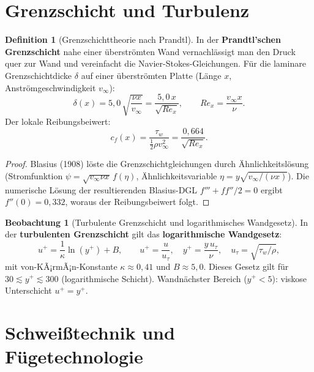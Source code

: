 ﻿\documentclass[a4paper,12pt]{report}
\theoremstyle{definition}
\newtheorem{definition}{Definition}
\newtheorem{beobachtung}{Beobachtung}
\begin{document}

\section{Grenzschicht und Turbulenz}

\begin{definition}[Grenzschichttheorie nach Prandtl]
In der \textbf{Prandtl'schen Grenzschicht} nahe einer überströmten
Wand vernachlässigt man den Druck quer zur Wand und vereinfacht
die Navier-Stokes-Gleichungen. Für die laminare Grenzschichtdicke
$\delta$ auf einer überströmten Platte (Länge $x$, Anströmgeschwindigkeit $v_\infty$):
\[
  \delta(x) = 5{,}0\,\sqrt{\frac{\nu x}{v_\infty}} = \frac{5{,}0\,x}{\sqrt{Re_x}},
  \qquad Re_x = \frac{v_\infty x}{\nu}.
\]
Der lokale Reibungsbeiwert:
\[
  c_f(x) = \frac{\tau_w}{\tfrac{1}{2}\rho v_\infty^2} = \frac{0{,}664}{\sqrt{Re_x}}.
\]
\end{definition}
\begin{proof}
Blasius (1908) löste die Grenzschichtgleichungen durch Ähnlichkeitslösung
(Strom\-funktion $\psi = \sqrt{v_\infty\nu x}\,f(\eta)$,
Ähnlichkeitsvariable $\eta = y\sqrt{v_\infty/(\nu x)}$).
Die numerische Lösung der resultierenden Blasius-DGL
$f''' + ff''/2 = 0$ ergibt $f''(0) = 0{,}332$, woraus der Reibungsbeiwert folgt.
\end{proof}

\begin{beobachtung}[Turbulente Grenzschicht und logarithmisches Wandgesetz]
In der \textbf{turbulenten Grenzschicht} gilt das \textbf{logarithmische Wandgesetz}:
\[
  u^+ = \frac{1}{\kappa}\ln(y^+) + B,
  \qquad u^+ = \frac{u}{u_\tau}, \quad y^+ = \frac{y\,u_\tau}{\nu},
  \quad u_\tau = \sqrt{\tau_w/\rho},
\]
mit von-KÃ¡rmÃ¡n-Konstante $\kappa \approx 0{,}41$ und $B \approx 5{,}0$.
Dieses Gesetz gilt für $30 \lesssim y^+ \lesssim 300$ (logarithmische Schicht).
Wandnächster Bereich ($y^+ < 5$): viskose Unterschicht $u^+ = y^+$.
\end{beobachtung}


\section{Schweißtechnik und Fügetechnologie}
\end{document}
